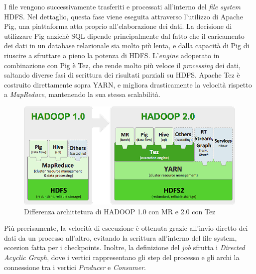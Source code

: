 \documentclass[12pt, a4paper, twocolumn]{article} %
\begin{document}

I file vengono successivamente trasferiti e processati all'interno del \textit{file system} HDFS. Nel dettaglio, questa fase viene eseguita attraverso l'utilizzo di Apache Pig, una piattaforma atta proprio all'elaborazione dei dati. La decisione di utilizzare Pig anzichè SQL dipende principalmente dal fatto che il caricamento dei dati in un database relazionale sia molto più lenta, e dalla capacità di Pig di riuscire a sfruttare a pieno la potenza di HDFS.
L'\textit{engine} adoperato in combinazione con Pig è Tez, che rende molto più veloce il \textit{processing} dei dati, saltando diverse fasi di scrittura dei risultati parziali su HDFS.
Apache Tez è costruito direttamente sopra YARN, e migliora drasticamente la velocità rispetto a \textit{MapReduce}, mantenendo la sua stessa scalabilità. 

\begin{figure}
	\centering
	\includegraphics{hadoop2.png}
	\caption{Differenza archittetura di HADOOP 1.0 con MR e 2.0 con Tez}
\end{figure}

Più precisamente, la velocità di esecuzione è ottenuta grazie all'invio diretto dei dati da un processo all'altro, evitando la scrittura all'interno del file system, eccezion fatta per i checkpoints. Inoltre, la definizione del \textit{job} sfrutta i \textit{Directed Acyclic Graph}, dove i vertici rappresentano gli step del processo e gli archi la connessione tra i vertici \textit{Producer} e \textit{Consumer}.
\end{document}
